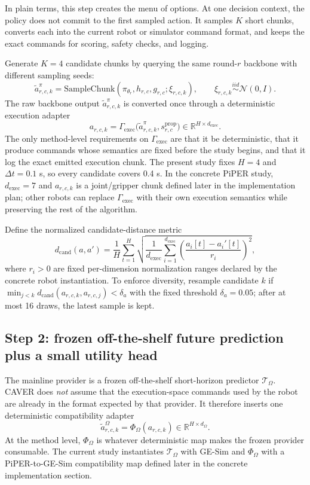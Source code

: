 \documentclass[10pt]{article}
\theoremstyle{plain}
\theoremstyle{definition}
\theoremstyle{remark}
\begin{document}
In plain terms, this step creates the menu of options. At one decision context, the policy does not commit to the first sampled action. It samples $K$ short chunks, converts each into the current robot or simulator command format, and keeps the exact commands for scoring, safety checks, and logging.

Generate $K=4$ candidate chunks by querying the same round-$r$ backbone with different sampling seeds:
\[
\tilde a^{\pi}_{r,c,k}=\mathrm{SampleChunk}(\pi_{\theta_r},h_{r,c},g_{r,c};\xi_{r,c,k}),\qquad \xi_{r,c,k}\stackrel{iid}{\sim}\mathcal N(0,I).
\]
The raw backbone output $\tilde a^{\pi}_{r,c,k}$ is converted once through a deterministic execution adapter
\[
a_{r,c,k}=\Gamma_{\mathrm{exec}}\big(\tilde a^{\pi}_{r,c,k},s^{\mathrm{prop}}_{r,c}\big)\in\mathbb R^{H\times d_{\mathrm{exec}}}.
\]
The only method-level requirements on $\Gamma_{\mathrm{exec}}$ are that it be deterministic, that it produce commands whose semantics are fixed before the study begins, and that it log the exact emitted execution chunk. The present study fixes $H=4$ and $\Delta t=0.1$ s, so every candidate covers 0.4 s. In the concrete PiPER study, $d_{\mathrm{exec}}=7$ and $a_{r,c,k}$ is a joint/gripper chunk defined later in the implementation plan; other robots can replace $\Gamma_{\mathrm{exec}}$ with their own execution semantics while preserving the rest of the algorithm.

Define the normalized candidate-distance metric
\[
d_{\mathrm{cand}}(a,a')
=
\frac{1}{H}\sum_{t=1}^{H}
\sqrt{\frac{1}{d_{\mathrm{exec}}}\sum_{i=1}^{d_{\mathrm{exec}}}
\left(\frac{a_i[t]-a_i'[t]}{r_i}\right)^2},
\]
where $r_i>0$ are fixed per-dimension normalization ranges declared by the concrete robot instantiation. To enforce diversity, resample candidate $k$ if $\min_{j<k}d_{\mathrm{cand}}(a_{r,c,k},a_{r,c,j})<\delta_a$ with the fixed threshold $\delta_a=0.05$; after at most 16 draws, the latest sample is kept.

\subsection{Step 2: frozen off-the-shelf future prediction plus a small utility head}
The mainline provider is a frozen off-the-shelf short-horizon predictor $\mathcal T_{\Omega}$. CAVER does \emph{not} assume that the execution-space commands used by the robot are already in the format expected by that provider. It therefore inserts one deterministic compatibility adapter
\[
\tilde a^{\Omega}_{r,c,k}=\Phi_{\Omega}(a_{r,c,k})\in\mathbb R^{H\times d_{\Omega}}.
\]
At the method level, $\Phi_{\Omega}$ is whatever deterministic map makes the frozen provider consumable. The current study instantiates $\mathcal T_{\Omega}$ with GE-Sim and $\Phi_{\Omega}$ with a PiPER-to-GE-Sim compatibility map defined later in the concrete implementation section.
\end{document}
